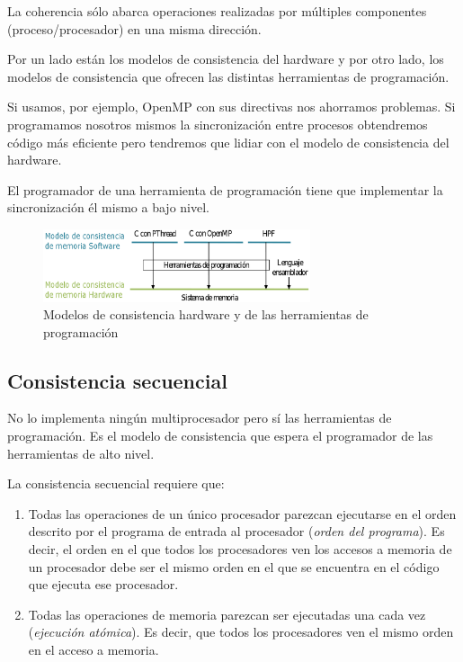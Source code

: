 \documentclass[10pt,a4paper,spanish]{report}
\begin{document}
La coherencia sólo abarca operaciones realizadas por múltiples componentes (proceso/procesador) en una misma dirección.

Por un lado están los modelos de consistencia del hardware y por otro lado, los modelos de consistencia que ofrecen las distintas herramientas de programación.

Si usamos, por ejemplo, OpenMP con sus directivas nos ahorramos problemas. Si programamos nosotros mismos la sincronización entre procesos obtendremos código más eficiente pero tendremos que lidiar con el modelo de consistencia del hardware.

El programador de una herramienta de programación tiene que implementar la sincronización él mismo a bajo nivel.

\begin{figure}[!h]
\centering
\includegraphics[width=0.7\textwidth]{74}
\caption{Modelos de consistencia hardware y de las herramientas de programación}
\label{mod_consistencia}
\end{figure}

\textcolor[rgb]{0.2,0.4,0.8}{\subsection{Consistencia secuencial}}
No lo implementa ningún multiprocesador pero sí las herramientas de programación. Es el modelo de consistencia que espera el programador de las herramientas de alto nivel.

La consistencia secuencial requiere que:
\begin{enumerate}[\color{azul}{\bf $\heartsuit$}]
    \item Todas las operaciones de un único procesador parezcan ejecutarse en el orden descrito por el programa de entrada al procesador (\textcolor[rgb]{0.2,0.4,0.8}{\textit{orden del programa}}). Es decir, el orden en el que todos los procesadores ven los accesos a memoria de un procesador debe ser el mismo orden en el que se encuentra en el código que ejecuta ese procesador.
    \item Todas las operaciones de memoria parezcan ser ejecutadas una cada vez (\textcolor[rgb]{0.2,0.4,0.8}{\textit{ejecución atómica}}). Es decir, que todos los procesadores ven el mismo orden en el acceso a memoria.
\end{enumerate}
\end{document}
